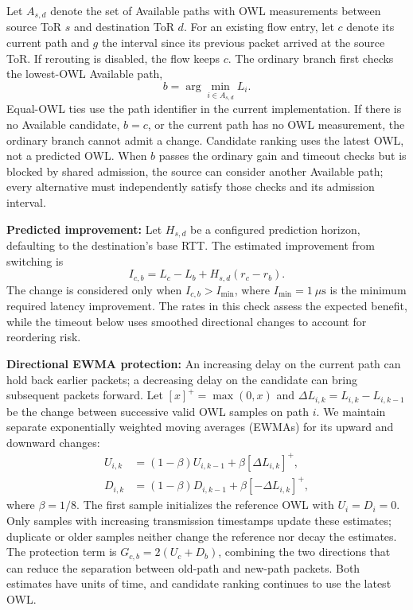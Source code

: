 \documentclass[10pt,journal,compsoc]{IEEEtran}
\begin{document}
Let $A_{s,d}$ denote the set of Available paths with OWL measurements between source ToR $s$ and destination ToR $d$. For an existing flow entry, let $c$ denote its current path and $g$ the interval since its previous packet arrived at the source ToR. If rerouting is disabled, the flow keeps $c$. The ordinary branch first checks the lowest-OWL Available path,
\begin{equation}
    b = \arg\min_{i\in A_{s,d}} L_i.
    \label{eq:best_path}
\end{equation}
Equal-OWL ties use the path identifier in the current implementation. If there is no Available candidate, $b=c$, or the current path has no OWL measurement, the ordinary branch cannot admit a change. Candidate ranking uses the latest OWL, not a predicted OWL. When $b$ passes the ordinary gain and timeout checks but is blocked by shared admission, the source can consider another Available path; every alternative must independently satisfy those checks and its admission interval.

\noindent
\textbf{Predicted improvement:} Let $H_{s,d}$ be a configured prediction horizon, defaulting to the destination's base RTT. The estimated improvement from switching is
\begin{equation}
    I_{c,b} = L_c-L_b+H_{s,d}(r_c-r_b).
    \label{eq:improvement}
\end{equation}
The change is considered only when $I_{c,b}>I_{\min}$, where $I_{\min}=1~\mu\mathrm{s}$ is the minimum required latency improvement. The rates in this check assess the expected benefit, while the timeout below uses smoothed directional changes to account for reordering risk.

\noindent
\textbf{Directional EWMA protection:} An increasing delay on the current path can hold back earlier packets; a decreasing delay on the candidate can bring subsequent packets forward. Let $[x]^+=\max(0,x)$ and $\Delta L_{i,k}=L_{i,k}-L_{i,k-1}$ be the change between successive valid OWL samples on path $i$. We maintain separate exponentially weighted moving averages (EWMAs) for its upward and downward changes:
\begin{equation}
    \begin{aligned}
        U_{i,k} &= (1-\beta)U_{i,k-1}+\beta[\Delta L_{i,k}]^+, \\
        D_{i,k} &= (1-\beta)D_{i,k-1}+\beta[-\Delta L_{i,k}]^+,
    \end{aligned}
    \label{eq:directional_ewma}
\end{equation}
where $\beta=1/8$. The first sample initializes the reference OWL with $U_i=D_i=0$. Only samples with increasing transmission timestamps update these estimates; duplicate or older samples neither change the reference nor decay the estimates. The protection term is $G_{c,b}=2(U_c+D_b)$, combining the two directions that can reduce the separation between old-path and new-path packets. Both estimates have units of time, and candidate ranking continues to use the latest OWL.
\end{document}
